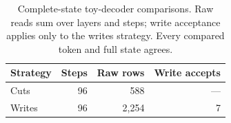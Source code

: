 \begin{table}[t]
\centering
\small
\caption{Complete-state toy-decoder comparisons. Raw reads sum over layers and steps; write acceptance applies only to the writes strategy. Every compared token and full state agrees.}
\label{tab:state}
\begin{tabular}{lrrr}
\toprule
Strategy & Steps & Raw rows & Write accepts \\
\midrule
Cuts & 96 & 588 & --- \\
Writes & 96 & 2,254 & 7 \\
\bottomrule
\end{tabular}
\end{table}
